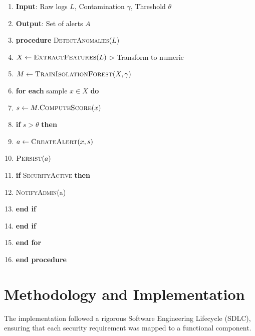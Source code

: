 \documentclass[preprint,12pt,a4paper]{elsarticle}
\begin{document}
\begin{tcolorbox}[title=Algorithm 1: API Anomaly Detection Pipeline]
\begin{enumerate}
    \item \textbf{Input}: Raw logs $L$, Contamination $\gamma$, Threshold $\theta$
    \item \textbf{Output}: Set of alerts $A$
    \item \textbf{procedure} \textsc{DetectAnomalies}($L$)
    \item \quad $X \leftarrow \textsc{ExtractFeatures}(L)$ \hfill $\triangleright$ Transform to numeric
    \item \quad $M \leftarrow \textsc{TrainIsolationForest}(X, \gamma)$
    \item \quad \textbf{for each} sample $x \in X$ \textbf{do}
    \item \quad \quad $s \leftarrow M.\textsc{ComputeScore}(x)$
    \item \quad \quad \textbf{if} $s > \theta$ \textbf{then}
    \item \quad \quad \quad $a \leftarrow \textsc{CreateAlert}(x, s)$
    \item \quad \quad \quad $\textsc{Persist}(a)$
    \item \quad \quad \quad \textbf{if} \textsc{SecurityActive} \textbf{then}
    \item \quad \quad \quad \quad \textsc{NotifyAdmin}(a)
    \item \quad \quad \quad \textbf{end if}
    \item \quad \quad \textbf{end if}
    \item \quad \textbf{end for}
    \item \textbf{end procedure}
\end{enumerate}
\end{tcolorbox}



\section{Methodology and Implementation}
The implementation followed a rigorous Software Engineering Lifecycle (SDLC), ensuring that each security requirement was mapped to a functional component.
\end{document}
